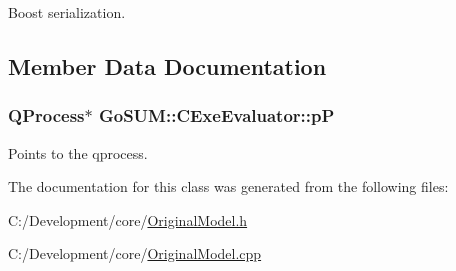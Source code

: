 Boost serialization. 



\subsection{Member Data Documentation}
\hypertarget{class_go_s_u_m_1_1_c_exe_evaluator_a92e5435e10a507cdc893eec96f7dfae0}{
\subsubsection[{p\-P}]{\setlength{\rightskip}{0pt plus 5cm}Q\-Process$\ast$ Go\-S\-U\-M\-::\-C\-Exe\-Evaluator\-::p\-P\hspace{0.3cm}{\ttfamily [protected]}}}\label{class_go_s_u_m_1_1_c_exe_evaluator_a92e5435e10a507cdc893eec96f7dfae0}


Points to the qprocess. 



The documentation for this class was generated from the following files\-:\begin{DoxyCompactItemize}
\item 
C\-:/\-Development/core/\hyperlink{_original_model_8h}{Original\-Model.\-h}\item 
C\-:/\-Development/core/\hyperlink{_original_model_8cpp}{Original\-Model.\-cpp}\end{DoxyCompactItemize}
